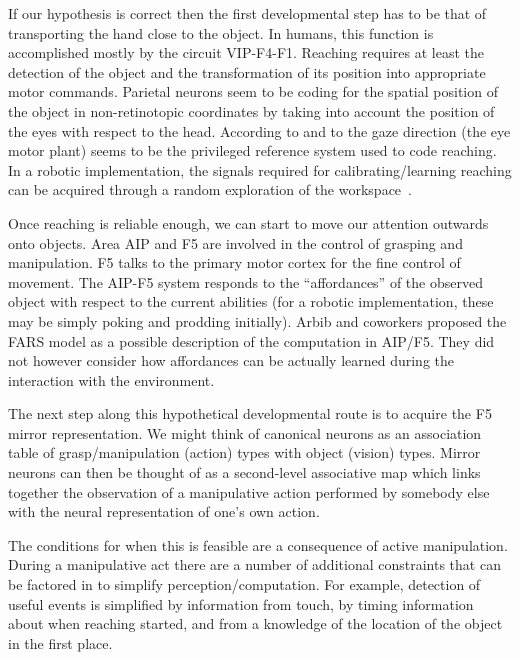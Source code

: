 If our hypothesis is correct then 
the first developmental step has to be that of transporting the hand 
close to the object. In humans, this function is accomplished mostly by the
circuit VIP-F4-F1. Reaching requires at least the detection of
the object and the transformation of its position into appropriate 
motor commands. Parietal neurons seem to be coding for the spatial
position of the object in non-retinotopic coordinates by taking
into account the position of the eyes with respect to the head. 
According to \cite{pouget-ducom-torri-bavelier-2002} and 
to \cite{flanders-daghestani-berthoz-1999} the 
gaze direction (the eye motor plant) seems to be the privileged
reference system used to code reaching. In a robotic
implementation, the signals required
for calibrating/learning reaching can be acquired 
through a random exploration of the 
workspace~\cite{metta99developmental, Marjanovic-96-SAB}.

Once reaching is reliable enough, we can start to move our attention 
outwards onto objects. Area AIP and F5 are involved in the
control of grasping and manipulation. F5 talks to the 
primary motor cortex for the fine control of movement. 
The AIP-F5 system responds to the ``affordances'' of the observed 
object with respect to the
current abilities (for a robotic implementation,
these may be simply poking and prodding initially). 
Arbib and coworkers \cite{fagg-arbib-1998} proposed 
the FARS model as a possible description of the computation in AIP/F5. 
They did not however consider how affordances can be 
actually learned during the interaction with the environment. 

The next step along this hypothetical developmental route is to 
acquire the F5 mirror representation. We might think of canonical neurons as
an association table of grasp/manipulation (action) types with object
(vision) types.  Mirror neurons can then be thought of as a 
second-level associative map which links together the observation of 
a manipulative action performed by somebody else with the neural 
representation of one's own action.

The conditions for when this is feasible are a consequence of active
manipulation. During a manipulative act there are a number of
additional constraints that can be factored in to simplify
perception/computation.  For example, detection of useful events is
simplified by information from touch, by timing information 
about when
reaching started, and from a knowledge of the location of the object in
the first place.

